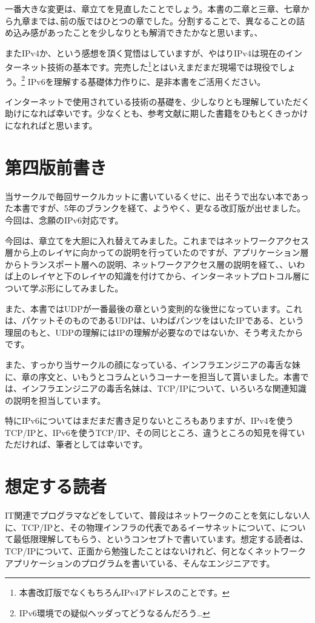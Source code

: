 一番大きな変更は、章立てを見直したことでしょう。本書の二章と三章、七章から九章までは､前の版ではひとつの章でした。分割することで、異なることの詰め込み感があったことを少しなりとも解消できたかなと思います。、

またIPv4か、という感想を頂く覚悟はしていますが、やはりIPv4は現在のインターネット技術の基本です。完売した\footnote{本書改訂版でなくもちろんIPv4アドレスのことです。}とはいえまだまだ現場では現役でしょう。\footnote{IPv6環境での疑似ヘッダってどうなるんだろう…}
IPv6を理解する基礎体力作りに、是非本書をご活用ください。

インターネットで使用されている技術の基礎を、少しなりとも理解していただく助けになれば幸いです。少なくとも、参考文献に期した書籍をひもとくきっかけになれればと思います。

\section*{第四版前書き}
当サークルで毎回サークルカットに書いているくせに、出そうで出ない本であった本書ですが、5年のブランクを経て、ようやく、更なる改訂版が出せました。今回は、念願のIPv6対応です。

今回は、章立てを大胆に入れ替えてみました。これまではネットワークアクセス層から上のレイヤに向かっての説明を行っていたのですが、アプリケーション層からトランスポート層への説明、ネットワークアクセス層の説明を経て、、いわば上のレイヤと下のレイヤの知識を付けてから、インターネットプロトコル層について学ぶ形にしてみました。

また、本書ではUDPが一番最後の章という変則的な後世になっています。これは、パケットそのものであるUDPは、いわばパンツをはいたIPである、という理屈のもと、UDPの理解にはIPの理解が必要なのではないか、そう考えたからです。

また、すっかり当サークルの顔になっている、インフラエンジニアの毒舌な妹に、章の序文と、いもうとコラムというコーナーを担当して貰いました。本書では、インフラエンジニアの毒舌名妹は、TCP/IPについて、いろいろな関連知識の説明を担当しています。


特にIPv6についてはまだまだ書き足りないところもありますが、IPv4を使うTCP/IPと、IPv6を使うTCP/IP、その同じところ、違うところの知見を得ていただければ、筆者としては幸いです。



\section*{想定する読者}
IT関連でプログラマなどをしていて、普段はネットワークのことを気にしない人に、TCP/IPと、その物理インフラの代表であるイーサネットについて、について最低限理解してもらう、というコンセプトで書いています。想定する読者は、TCP/IPについて、正面から勉強したことはないけれど、何となくネットワークアプリケーションのプログラムを書いている、そんなエンジニアです。

